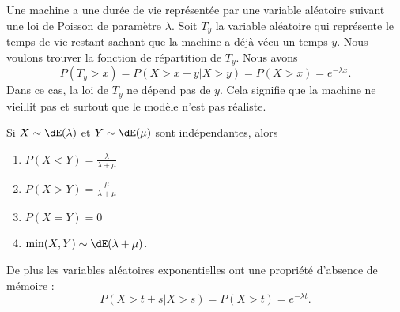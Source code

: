 \begin{example}
	Une machine a une durée de vie représentée par une variable aléatoire suivant une loi de Poisson de paramètre \( \lambda\). Soit \( T_y\) la variable aléatoire qui représente le temps de vie restant sachant que la machine a déjà vécu un temps \( y\). Nous voulons trouver la fonction de répartition de \( T_y\). Nous avons
	\begin{equation}
		P(T_y>x)=P(X>x+y|X>y)=P(X>x)= e^{-\lambda x}.
	\end{equation}
	Dans ce cas, la loi de \( T_y\) ne dépend pas de \( y\). Cela signifie que la machine ne vieillit pas et surtout que le modèle n'est pas réaliste.
\end{example}

\begin{proposition}
	Si \( X\sim\dE(\lambda)\) et \( Y\sim\dE(\mu)\) sont indépendantes, alors
	\begin{enumerate}
		\item
		      \( P(X<Y)=\frac{ \lambda }{ \lambda+\mu }\)
		\item
		      \( P(X>Y)=\frac{ \mu }{ \lambda+\mu }\)
		\item
		      \( P(X=Y)=0\)
		\item
		      \( \min(X,Y)\sim\dE(\lambda+\mu)\).
	\end{enumerate}
	De plus les variables aléatoires exponentielles ont une propriété d'absence de mémoire :
	\begin{equation}
		P(X>t+s|X>s)=P(X>t)= e^{-\lambda t}.
	\end{equation}
\end{proposition}

